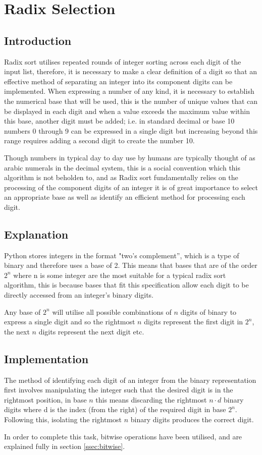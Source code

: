 \documentclass[12pt]{article}
\begin{document}
	\section{Radix Selection}
	
	\label{sec:radixselection}
	\subsection{Introduction}
	Radix sort utilises repeated rounds of integer sorting across each digit of the input list, therefore, it is necessary to make a clear definition of a digit so that an effective method of separating an integer into its component digits can be implemented. When expressing a number of any kind, it is necessary to establish the numerical base that will be used, this is the number of unique values that can be displayed in each digit and when a value exceeds the maximum value within this base, another digit must be added; i.e. in standard decimal or base 10 numbers 0 through 9 can be expressed in a single digit but increasing beyond this range requires adding a second digit to create the number 10.
	\par
	Though numbers in typical day to day use by humans are typically thought of as arabic numerals in the decimal system, this is a social convention which this algorithm is not beholden to, and as Radix sort fundamentally relies on the processing of the component digits of an integer it is of great importance to select an appropriate base as well as identify an efficient method for processing each digit.
	\subsection{Explanation}
	\label{ssec:radixexplanation}
	Python stores integers in the format "two’s complement”, which is a type of binary and therefore uses a base of 2. This means that bases that are of the order $2^n$ where n is some integer are the most suitable for a typical radix sort algorithm, this is because bases that fit this specification allow each digit to be directly accessed from an integer's binary digits.
	\par 
	Any base of $2^n$ will utilise all possible combinations of $n$ digits of binary to express a single digit and so the rightmost $n$ digits represent the first digit in $2^n$, the next $n$ digits represent the next digit etc.
	\subsection{Implementation}
 	The method of identifying each digit of an integer from the binary representation first involves manipulating the integer such that the desired digit is in the rightmost position, in base $n$ this means discarding the rightmost $n \cdot d$ binary digits where d is the index (from the right) of the required digit in base $2^n$. Following this, isolating the rightmost $n$ binary digits produces the correct digit.  
		\par
	In order to complete this task, bitwise operations have been utilised, and are explained fully in section \ref{ssec:bitwise}.
\end{document}
